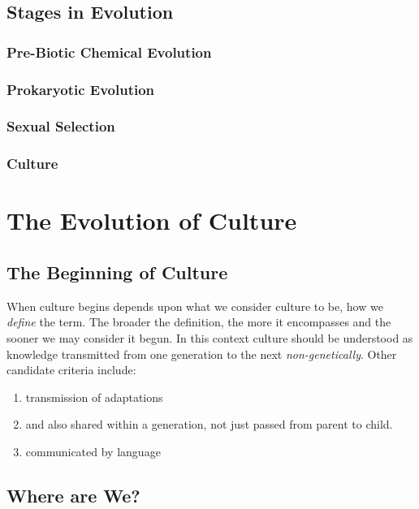 \documentclass[10pt,titlepage]{book}
\begin{document}
  \section{Stages in Evolution}

  \subsection{Pre-Biotic Chemical Evolution}

  \subsection{Prokaryotic Evolution}

  \subsection{Sexual Selection}

  \subsection{Culture}

\chapter{The Evolution of Culture}

\section{The Beginning of Culture}

When culture begins depends upon what we consider culture to be, how we \emph{define} the term.
The broader the definition, the more it encompasses and the sooner we may consider it begun.
In this context culture should be understood as knowledge transmitted from one generation to the next \emph{non-genetically}.
Other candidate criteria include:

\begin{enumerate}
  \item transmission of adaptations
  \item and also shared within a generation, not just passed from parent to child.
  \item communicated by language
\end{enumerate}

\section{Where are We?}
\end{document}
